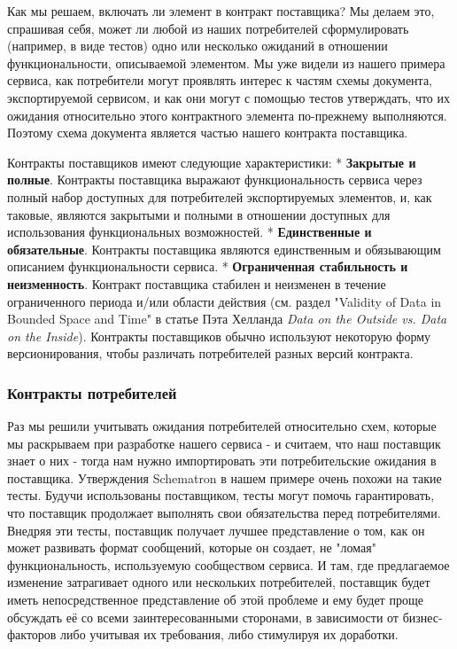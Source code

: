 \documentclass[11pt]{article}
\begin{document}
Как мы решаем, включать ли элемент в контракт поставщика? Мы делаем это,
спрашивая себя, может ли любой из наших потребителей сформулировать
(например, в виде тестов) одно или несколько ожиданий в отношении
функциональности, описываемой элементом. Мы уже видели из нашего примера
сервиса, как потребители могут проявлять интерес к частям схемы
документа, экспортируемой сервисом, и как они могут с помощью тестов
утверждать, что их ожидания относительно этого контрактного элемента
по-прежнему выполняются. Поэтому схема документа является частью нашего
контракта поставщика.

Контракты поставщиков имеют следующие характеристики: * \textbf{Закрытые
и полные}. Контракты поставщика выражают функциональность сервиса через
полный набор доступных для потребителей экспортируемых элементов, и, как
таковые, являются закрытыми и полными в отношении доступных для
использования функциональных возможностей. * \textbf{Единственные и
обязательные}. Контракты поставщика являются единственным и обязывающим
описанием функциональности сервиса. * \textbf{Ограниченная стабильность
и неизменность}. Контракт поставщика стабилен и неизменен в течение
ограниченного периода и/или области действия (см. раздел "Validity of
Data in Bounded Space and Time" в статье Пэта Хелланда \emph{Data on the
Outside vs. Data on the Inside}). Контракты поставщиков обычно
используют некоторую форму версионирования, чтобы различать потребителей
разных версий контракта.

\subsubsection{Контракты
потребителей}\label{ux43aux43eux43dux442ux440ux430ux43aux442ux44b-ux43fux43eux442ux440ux435ux431ux438ux442ux435ux43bux435ux439}

Раз мы решили учитывать ожидания потребителей относительно схем, которые
мы раскрываем при разработке нашего сервиса - и считаем, что наш
поставщик знает о них - тогда нам нужно импортировать эти
потребительские ожидания в поставщика. Утверждения Schematron в нашем
примере очень похожи на такие тесты. Будучи использованы поставщиком,
тесты могут помочь гарантировать, что поставщик продолжает выполнять
свои обязательства перед потребителями. Внедряя эти тесты, поставщик
получает лучшее представление о том, как он может развивать формат
сообщений, которые он создает, не "ломая" функциональность, используемую
сообществом сервиса. И там, где предлагаемое изменение затрагивает
одного или нескольких потребителей, поставщик будет иметь
непосредственное представление об этой проблеме и ему будет проще
обсуждать её со всеми заинтересованными сторонами, в зависимости от
бизнес-факторов либо учитывая их требования, либо стимулируя их
доработки.
\end{document}
